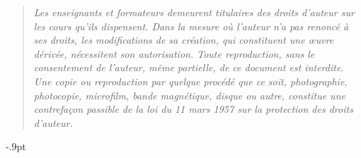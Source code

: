   \vspace {12cm}

   \begin {quote}
   \em Les enseignants et formateurs demeurent titulaires des droits d'auteur sur les cours qu'ils dispensent.    
Dans la mesure où l'auteur n'a pas renoncé à ses droits, les modifications de sa création, qui constituent une œuvre dérivée, nécessitent son autorisation. 
    Toute  reproduction,  sans le consentement de l'auteur, 
    même  partielle,  de ce document est
    interdite.  Une copie ou reproduction  par quelque procédé que
    ce   soit,   photographie,    photocopie,   microfilm,   bande
    magnétique,   disque  ou  autre,   constitue  une  contrefaçon
   passible  de la loi du 11  mars  1957  sur la  protection  des
    droits d'auteur.
    \end {quote}
\newpage

\setcounter{page}{1}


\begingroup
\baselineskip\dimexpr\baselineskip-.9pt\relax
\tableofcontents
\endgroup


\newpage
~ %
\newpage









%


